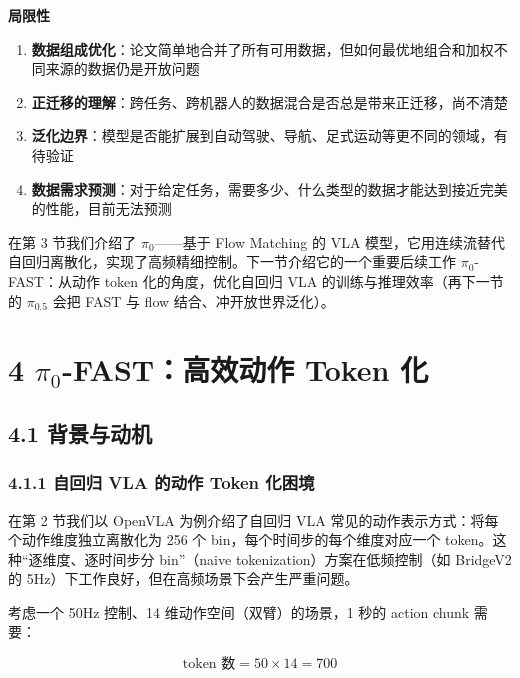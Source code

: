 \documentclass[
  chinese,
]{ctexart}
\providecommand{\tightlist}{%
  \setlength{\itemsep}{0pt}\setlength{\parskip}{0pt}}
\begin{document}
\textbf{局限性}

\begin{enumerate}
\def\labelenumi{\arabic{enumi}.}
\tightlist
\item
  \textbf{数据组成优化}：论文简单地合并了所有可用数据，但如何最优地组合和加权不同来源的数据仍是开放问题
\item
  \textbf{正迁移的理解}：跨任务、跨机器人的数据混合是否总是带来正迁移，尚不清楚
\item
  \textbf{泛化边界}：模型是否能扩展到自动驾驶、导航、足式运动等更不同的领域，有待验证
\item
  \textbf{数据需求预测}：对于给定任务，需要多少、什么类型的数据才能达到接近完美的性能，目前无法预测
\end{enumerate}

在第 3 节我们介绍了 \(\pi_0\)------基于 Flow Matching 的 VLA
模型，它用连续流替代自回归离散化，实现了高频精细控制。下一节介绍它的一个重要后续工作
\(\pi_0\)-FAST：从动作 token 化的角度，优化自回归 VLA
的训练与推理效率（再下一节的 \(\pi_{0.5}\) 会把 FAST 与 flow
结合、冲开放世界泛化）。

\section{\texorpdfstring{4 \(\pi_0\)-FAST：高效动作 Token
化}{4 \textbackslash pi\_0-FAST：高效动作 Token 化}}\label{pi_0-fastux9ad8ux6548ux52a8ux4f5c-token-ux5316}

\subsection{4.1 背景与动机}\label{ux80ccux666fux4e0eux52a8ux673a-2}

\subsubsection{4.1.1 自回归 VLA 的动作 Token
化困境}\label{ux81eaux56deux5f52-vla-ux7684ux52a8ux4f5c-token-ux5316ux56f0ux5883}

在第 2 节我们以 OpenVLA 为例介绍了自回归 VLA
常见的动作表示方式：将每个动作维度独立离散化为 256 个
bin，每个时间步的每个维度对应一个 token。这种``逐维度、逐时间步分
bin''（naive tokenization）方案在低频控制（如 BridgeV2 的
5Hz）下工作良好，但在高频场景下会产生严重问题。

考虑一个 50Hz 控制、14 维动作空间（双臂）的场景，1 秒的 action chunk
需要：

\[
\text{token 数} = 50 \times 14 = 700
\]
\end{document}
